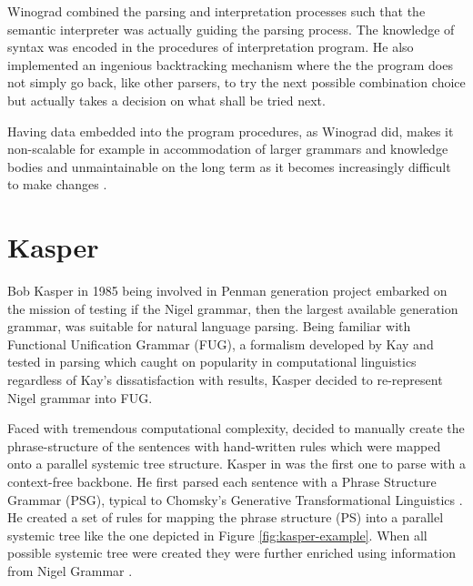 Winograd combined the parsing and interpretation processes such that the semantic interpreter was actually guiding the parsing process. The knowledge of syntax was encoded in the procedures of interpretation program. He also implemented an ingenious backtracking mechanism where the the program does not simply go back, like other parsers, to try the next possible combination choice but actually takes a decision on what shall be tried next.  

Having data embedded into the program procedures, as Winograd did, makes it non-scalable for example in accommodation of larger grammars and knowledge bodies and unmaintainable on the long term as it becomes increasingly difficult to make changes \citep{Weerasinghe1994}.

\section{Kasper}
Bob Kasper in 1985 being involved in Penman generation project embarked on the mission of testing if the Nigel grammar, then the largest available generation grammar, was suitable for natural language parsing. Being familiar with Functional Unification Grammar (FUG), a formalism developed by Kay and tested in parsing \citep{Kay1985} which caught on popularity in computational linguistics regardless of Kay's dissatisfaction with results, Kasper decided to re-represent Nigel grammar into FUG. 

Faced with tremendous computational complexity, \citet{Kasper1988} decided to manually create the phrase-structure of the sentences with hand-written rules which were mapped onto a parallel systemic tree structure. Kasper in \citeyear{Kasper1988} was the first one to parse with a context-free backbone. He first parsed each sentence with a Phrase Structure Grammar (PSG), typical to Chomsky's Generative Transformational Linguistics \citet{Chomsky1957}. He created a set of rules for mapping the phrase structure (PS) into a parallel systemic tree like the one depicted in Figure \ref{fig:kasper-example}. When all possible systemic tree were created they were further enriched using information from Nigel Grammar \citep{Matthiessen1985}.

